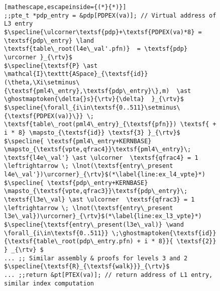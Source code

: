 \begin{figure}
\begin{lstlisting}[mathescape,escapeinside={(*}{*)}]
;;pte_t *pdp_entry = &pdp[PDPEX(va)]; // Virtual address of L3 entry
$\specline{\ulcorner\textsf{pdp}+\textsf{PDPEX(va)*8} = \textsf{pdp\_entry} \land \textsf{table\_root(l4e\_val'.pfn)}  = \textsf{pdp} \urcorner }_{\rtv}$
$\specline{\textsf{P} \ast \mathcal{I}\texttt{ASpace}_{\textsf{id}}(\theta,\Xi\setminus\{\textsf{pml4\_entry},\textsf{pdp\_entry}\},m)  \ast \ghostmaptoken{\delta{}s}{\rtv}{\delta}  }_{\rtv}$
$\specline{\forall_{i\in\textsf{0..511}\setminus\{\textsf{PDPEX(va)}\}} \; \textsf{table\_root(pml4\_entry}_{\textsf{pfn}}) \textsf{ + i * 8} \mapsto_{\textsf{id}} \textsf{3} }_{\rtv}$
$\specline{ \textsf{pml4\_entry+KERNBASE} \mapsto_{\textsf{vpte,qfrac4}}\textsf{pml4\_entry}\; \textsf{l4e\_val'} \ast \ulcorner  \textsf{qfrac4} = 1 \leftrightarrow \; \lnot(\textsf{entry\_present l4e\_val'})\urcorner}_{\rtv}$(*\label{line:ex_l4_vpte}*)
$\specline{ \textsf{pdp\_entry+KERNBASE} \mapsto_{\textsf{vpte,qfrac3}}\textsf{pdp\_entry}\; \textsf{l3e\_val} \ast \ulcorner  \textsf{qfrac3} = 1 \leftrightarrow \; \lnot(\textsf{entry\_present l3e\_val})\urcorner}_{\rtv}$(*\label{line:ex_l3_vpte}*)
$\specline{\textsf{entry\_present(l3e\_val)} \wand \forall_{i\in\textsf{0..511}} \;\ghostmaptoken{\textsf{id}}{\textsf{table\_root(pdp\_entry.pfn) + i * 8}}{ \textsf{2}} } _{\rtv} $
... ;; Similar assembly & proofs for levels 3 and 2
$\specline{\textsf{R}_{\textsf{walk}}}_{\rtv}$
... ;;return &pt[PTEX(va)]; // return address of L1 entry, similar index computation
\end{lstlisting}


\end{figure}
